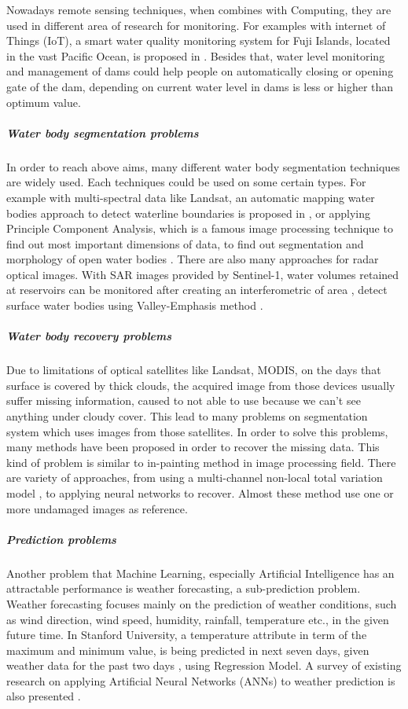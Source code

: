 Nowadays remote sensing techniques, when combines with Computing, they are used in different area of research for monitoring. For examples with internet of Things (IoT), a smart water quality monitoring system for Fuji Islands, located in the vast Pacific Ocean, is proposed in \cite{Prasad2015}. Besides that, water level monitoring and management of dams \cite{Sreekar2018} could help people on automatically closing or opening gate of the dam, depending on current water level in dams is less or higher than optimum value.

\subparagraph{Water body segmentation problems} In order to reach above aims, many different water body segmentation techniques are widely used. Each techniques could be used on some certain types. For example with multi-spectral data like Landsat, an automatic mapping water bodies approach to detect waterline boundaries is proposed in \cite{Verpoorter2012}, or applying Principle Component Analysis, which is a famous image processing technique to find out most important dimensions of data, to find out segmentation and morphology of open water bodies \cite{Jorge2006}. There are also many approaches for radar optical images. With SAR images provided by Sentinel-1, water volumes retained at reservoirs can be monitored after creating an interferometric of area \cite{Amitrano2014}, detect surface water bodies using Valley-Emphasis method \cite{Nguyen2016}.

\subparagraph{Water body recovery problems} Due to limitations of optical satellites like Landsat, MODIS, on the days that surface is covered by thick clouds, the acquired image from those devices usually suffer missing information, caused to not able to use because we can't see anything under cloudy cover. This lead to many problems on segmentation system which uses images from those satellites. In order to solve this problems, many methods have been proposed in order to recover the missing data. This kind of problem is similar to 
in-painting method in image processing field. There are variety of approaches, from using a multi-channel non-local total variation model \cite{Cheng2014}, to applying neural networks to recover\cite{Zhang2018}. Almost these method use one or more undamaged images as reference. 

\subparagraph{Prediction problems} Another problem that Machine Learning, especially Artificial Intelligence has an attractable performance is weather forecasting, a sub-prediction problem. Weather forecasting focuses mainly on the prediction of weather conditions, such as wind direction, wind speed, humidity, rainfall, temperature etc., in the given future time. In Stanford University, a temperature attribute in term of the maximum and minimum value, is being predicted in next seven days, given weather data for the past two days \cite{Holmstrom2016MachineLA}, using Regression Model. A survey of existing research on applying Artificial Neural Networks (ANNs) to weather prediction is also presented \cite{Culclasure2013UsingNN}.

